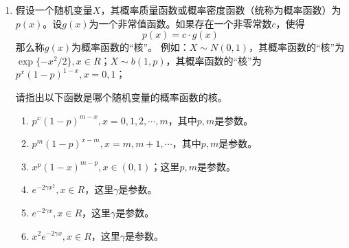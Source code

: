 \begin{enumerate}
\item  假设一个随机变量$X$，其概率质量函数或概率密度函数（统称为概率函数）为$p(x)$。设$g(x)$为一个非常值函数。如果存在一个非零常数$c$，使得
$$
p(x) = c \cdot g(x)
$$
那么称$g(x)$为概率函数的“核”。
例如：$X\sim N(0,1)$，其概率函数的“核”为$\exp\{-x^2/2\},x \in R$；$X\sim b(1,p)$，其概率函数的“核”为$p^{x}(1-p)^{1-x},x = 0,1$；

请指出以下函数是哪个随机变量的概率函数的核。
\begin{enumerate}
    \item $p^{x}(1-p)^{m-x}, x=0,1,2,\cdots,m$，其中$p,m$是参数。
    \item $p^{m}(1-p)^{x-m}, x=m,m+1,\cdots$，其中$p,m$是参数。
    \item $x^{p}(1-x)^{m-p},x\in (0,1)$；这里$p,m$是参数。
\item $e^{-2\gamma x^2},x\in R$，这里$\gamma$是参数。
\item $e^{-2\gamma x},x\in R$，这里$\gamma$是参数。
\item $x^{2}e^{-2\gamma x},x\in R$，这里$\gamma$是参数。
\end{enumerate}
        \end{enumerate}
